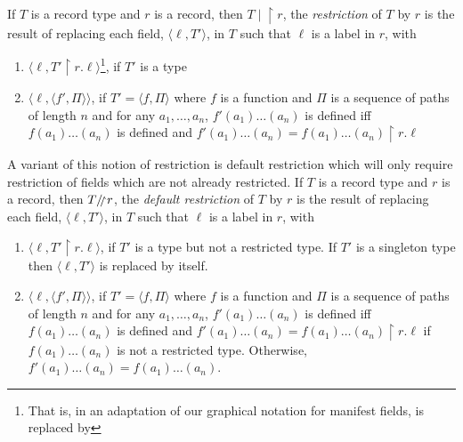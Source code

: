 If $T$ is a record type and $r$ is a record, then $T\!\mid\!\restriction\! r$, the
\textit{restriction} of $T$ by
$r$ is the result
of replacing each field, $\langle \ell, T'\rangle$, in $T$ such that
$\ell$ is a label in $r$, with 
\begin{enumerate}
\item  $\langle\ell,T'\!\restriction\!r.\ell\rangle$\footnote{That is,
    in an adaptation of our
graphical notation for manifest fields,  is
replaced by }, if
$T'$ is a type
\item $\langle\ell,\langle f',\Pi\rangle\rangle$, if $T'=\langle
  f,\Pi\rangle$ where $f$ is a function and $\Pi$ is a sequence of
  paths of length $n$ and for any
  $a_1,\ldots,a_n$, $f'(a_1)\ldots(a_n)$ is defined iff
  $f(a_1)\ldots(a_n)$ is defined and $f'(a_1)\ldots(a_n) =
  f(a_1)\ldots(a_n)\!\restriction\!r.\ell$
\end{enumerate}

A variant of this notion of restriction is default restriction
which will only require restriction of fields which are not already
restricted. If $T$ is a record type and $r$ is a record, then
$T\drestr r$, the
\textit{default restriction} of $T$ by
$r$ is the result
of replacing each field, $\langle \ell, T'\rangle$, in $T$ such that
$\ell$ is a label in $r$, with 
\begin{enumerate}
\item  $\langle\ell,T'\!\restriction\!r.\ell\rangle$, if
$T'$ is a type but not a restricted type. If $T'$ is a
singleton type then $\langle \ell, T'\rangle$ is replaced by itself.
\item $\langle\ell,\langle f',\Pi\rangle\rangle$, if $T'=\langle
  f,\Pi\rangle$ where $f$ is a function and $\Pi$ is a sequence of
  paths of length $n$ and for any
  $a_1,\ldots,a_n$, $f'(a_1)\ldots(a_n)$ is defined iff
  $f(a_1)\ldots(a_n)$ is defined and $f'(a_1)\ldots(a_n) =
  f(a_1)\ldots(a_n)\!\restriction\!r.\ell$ if $f(a_1)\ldots(a_n)$ is not a
  restricted type. Otherwise, $f'(a_1)\ldots(a_n) =
  f(a_1)\ldots(a_n)$.
\end{enumerate}  


